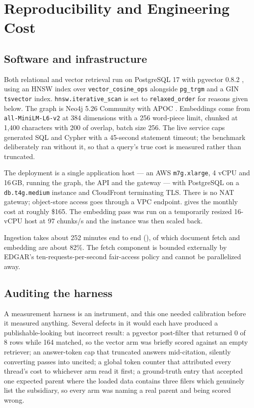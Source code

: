 \section{Reproducibility and Engineering Cost}
\label{sec:repro}

\subsection{Software and infrastructure}

Both relational and vector retrieval run on PostgreSQL 17 with pgvector 0.8.2
\citep{pgvector2024}, using an HNSW index over \texttt{vector\_cosine\_ops}
\citep{malkov2018hnsw} alongside \texttt{pg\_trgm} and a GIN \texttt{tsvector}
index. \texttt{hnsw.iterative\_scan} is set to \texttt{relaxed\_order} for reasons
given below. The graph is Neo4j 5.26 Community with APOC \citep{neo4j2024}.
Embeddings come from \texttt{all-MiniLM-L6-v2} at 384 dimensions with a 256
word-piece limit, chunked at 1{,}400 characters with 200 of overlap, batch size
256. The live service caps generated SQL and Cypher with a 45-second statement
timeout; the benchmark deliberately ran without it, so that a query's true cost
is measured rather than truncated.

The deployment is a single application host --- an AWS \texttt{m7g.xlarge}, 4 vCPU
and 16\,GB, running the graph, the API and the gateway --- with PostgreSQL on a
\texttt{db.t4g.medium} instance and CloudFront terminating TLS. There is no NAT
gateway; object-store access goes through a VPC endpoint.  gives
the monthly cost at roughly \$165. The embedding pass was run on a temporarily
resized 16-vCPU host at 97 chunks/s and the instance was then scaled back.

Ingestion takes about 252 minutes end to end (), of which
document fetch and embedding are about 82\%. The fetch component is bounded
externally by EDGAR's ten-requests-per-second fair-access policy
\citep{sec2024edgar} and cannot be parallelized away.

\subsection{Auditing the harness}
\label{sec:harness}

A measurement harness is an instrument, and this one needed calibration before it
measured anything. Several defects in it would each have produced a
publishable-looking but incorrect result: a pgvector post-filter that returned 0
of 8 rows while 164 matched, so the vector arm was briefly scored against an
empty retriever; an answer-token cap that truncated answers mid-citation,
silently converting passes into uncited; a global token counter that attributed
every thread's cost to whichever arm read it first; a ground-truth entry that
accepted one expected parent where the loaded data contains three filers which
genuinely list the subsidiary, so every arm was naming a real parent and being
scored wrong.

